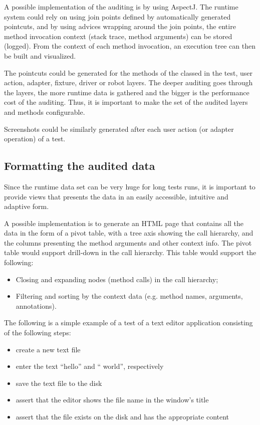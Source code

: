 A possible implementation of the auditing is by using AspectJ. The runtime system could rely on using join points defined by automatically generated pointcuts, and by using advices wrapping around the join points, the entire method invocation context (stack trace, method arguments) can be stored (logged). \cite{AOPwiki} From the context of each method invocation, an execution tree can then be built and visualized.

The pointcuts could be generated for the methods of the classed in the test, user action, adapter, fixture, driver or robot layers. The deeper auditing goes through the layers, the more runtime data is gathered and the bigger is the performance cost of the auditing. Thus, it is important to make the set of the audited layers and methods configurable.

Screenshots could be similarly generated after each user action (or adapter operation) of a test.

\subsection {Formatting the audited data}

Since the runtime data set can be very huge for long tests runs, it is important to provide views that presents the data in an easily accessible, intuitive and adaptive form. 

A possible implementation is to generate an HTML page that contains all the data in the form of a pivot table, with a tree axis showing the call hierarchy, and the columns presenting the method arguments and other context info. The pivot table would support drill-down in the call hierarchy. This table would support the following:
\begin{itemize}
\item Closing and expanding nodes (method calls) in the call hierarchy;
\item Filtering and sorting by the context data (e.g. method names, arguments, annotations).
\end{itemize}

The following is a simple example of a test of a text editor application consisting of the following steps:
\begin{itemize}
\item create a new text file
\item enter the text ``hello'' and `` world'', respectively
\item save the text file to the disk
\item assert that the editor shows the file name in the window's title
\item assert that the file exists on the disk and has the appropriate content
\end{itemize}

